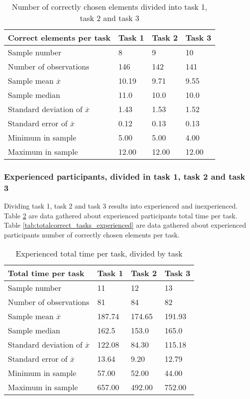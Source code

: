\begin{table}[H]
	\centering
	\begin{tabular}{l|l|l|l}
		Correct elements per task & Task 1 & Task 2 & Task 3\\ \hline
		Sample number & 8  & 9  & 10   \\
		Number of observations & 146    & 142     & 141        \\
		Sample mean $\overline{x}$ & 10.19  &  9.71  &   9.55   \\
		Sample median & 11.0 &  10.0  &  10.0   \\
		Standard deviation of $\overline{x}$ & 1.43  & 1.53 & 1.52    \\
		Standard error of $\overline{x}$ & 0.12 &  0.13 & 0.13  \\
		Minimum in sample  & 5.00  & 5.00  &   4.00  \\
		Maximum in sample  & 12.00 & 12.00  & 12.00 \\ \hline
	\end{tabular}
	\caption[Correct elements, divided into task 1, task 2 and task 3]{Number of correctly chosen elements divided into task 1, task 2 and task 3}
	\label{tab:totalcorrect_tasks}
\end{table}

\subsubsection{Experienced participants, divided in task 1, task 2 and task 3}\label{sec:taskdivided_experienced}

Dividing task 1, task 2 and task 3 results into experienced and inexperienced. Table \ref{tab:totaltime_tasks_experienced} are data gathered about experienced participants total time per task. Table \ref{tab:totalcorrect_tasks_experienced} are data gathered about experienced participants number of correctly chosen elements per task.

\begin{table}[H]
	\centering
	\begin{tabular}{l|l|l|l}
		Total time per task & Task 1 & Task 2 & Task 3 \\ \hline
		Sample number & 11  & 12  & 13   \\
		Number of observations & 81    & 84      & 82   \\
		Sample mean $\overline{x}$  & 187.74  &  174.65  &  191.93   \\
		Sample median  & 162.5  &  153.0  &  165.0  \\
		Standard deviation of $\overline{x}$ & 122.08  & 84.30  & 115.18    \\
		Standard error of $\overline{x}$ & 13.64  & 9.20 & 12.79   \\
		Minimum in sample   & 57.00  & 52.00 &  44.00  \\
		Maximum in sample  & 657.00 & 492.00  & 752.00 \\ \hline
	\end{tabular}
	\caption[Total time, task and experienved divided]{Experienced total time per task, divided by task}
	\label{tab:totaltime_tasks_experienced}
\end{table}

